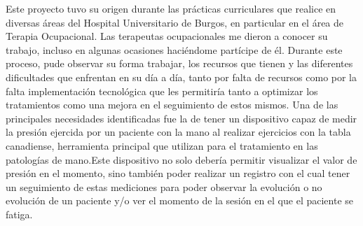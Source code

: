 Este proyecto tuvo su origen durante las prácticas curriculares que realice en diversas áreas del Hospital Universitario de Burgos, en particular en el área de Terapia Ocupacional. 
Las terapeutas ocupacionales me dieron a conocer su trabajo, incluso en algunas ocasiones haciéndome partícipe de él. Durante este proceso, pude observar su forma trabajar, los recursos que tienen y las diferentes dificultades que enfrentan en su día a día, tanto por falta de recursos como por la falta implementación tecnológica que les permitiría tanto a optimizar los tratamientos como una mejora en el seguimiento de estos mismos. 
Una de las principales necesidades identificadas fue la de tener un dispositivo capaz de medir la presión ejercida por un paciente con la mano al realizar ejercicios con la tabla canadiense, herramienta principal que utilizan para el tratamiento en las patologías de mano.Este dispositivo no solo debería permitir visualizar el valor de presión en el momento, sino también poder realizar un registro con el cual tener un seguimiento de estas mediciones para poder observar la evolución o no evolución de un paciente y/o ver el momento de la sesión en el que el paciente se fatiga. 
